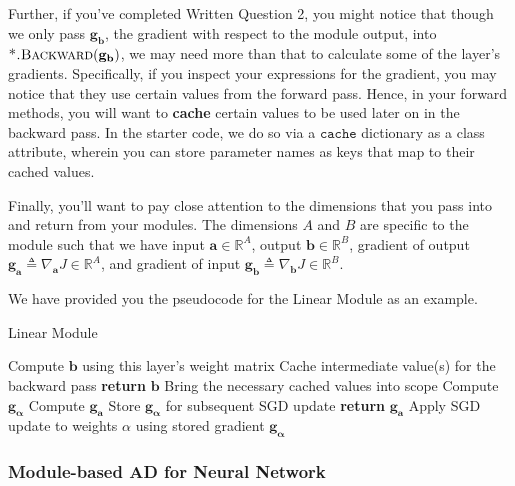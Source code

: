 \documentclass[11pt,addpoints,answers]{exam}
\newcommand{\Rb}{\mathbb{R}}
\newcommand{\av}{\mathbf{a}}
\newcommand{\bv}{\mathbf{b}}
\newcommand{\gv}{\mathbf{g}}
\newcommand{\alphav     }{\boldsymbol \alpha     }
\begin{document}
Further, if you've completed Written Question 2, you might notice that though we only pass $\gv_{\bv}$, the gradient with respect to the module output, into $\textproc{*.Backward}(\gv_{\bv})$, we may need more than that to calculate some of the layer's gradients. Specifically, if you inspect your expressions for the gradient, you may notice that they use certain values from the forward pass. Hence, in your forward methods, you will want to \textbf{cache} certain values to be used later on in the backward pass. In the starter code, we do so via a $\texttt{cache}$ dictionary as a class attribute, wherein you can store parameter names as keys that map to their cached values.

Finally, you’ll want to pay close attention to the dimensions that you pass into and return from your modules. The dimensions $A$ and $B$ are specific to the module such that we have input $\av \in \Rb^A$, output $\bv \in \Rb^B$, gradient of output $\gv_{\av} \triangleq \nabla_{\av}J \in \Rb^A$, and gradient of input $\gv_{\bv} \triangleq \nabla_{\bv}J \in \Rb^B$. 

We have provided you the pseudocode for the Linear Module as an example.

\begin{description}
    \item[Linear Module]
\end{description}
\begin{algorithm}
      \begin{algorithmic}[1]
        \Procedure{Forward}{$\av$}
          \State Compute $\bv$ using this layer's weight matrix
          \State Cache intermediate value(s) for the backward pass 
          \State \textbf{return} $\bv$
        \EndProcedure
        \Procedure{Backward}{$\gv_{\bv}$}
          \State Bring the necessary cached values into scope
          \State Compute $\gv_{\alphav}$ 
          \State Compute $\gv_{\av}$ 
          \State Store $\gv_{\alphav}$ for subsequent SGD update
          \State \textbf{return} $\gv_{\av}$
        \EndProcedure
          \State Apply SGD update to weights $\alpha$ using stored gradient $\gv_{\alphav}$
        \EndProcedure
      \end{algorithmic}
\end{algorithm}

\subsubsection{Module-based AD for Neural Network}
\end{document}
